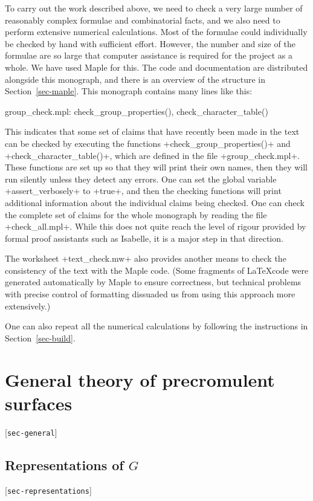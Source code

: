 \documentclass[reqno]{amsart}
\newcommand{\lbl}[1]{\label{#1}\textup{[\texttt{#1}]}\par}
\newcommand{\lbl}{\label}
\renewcommand{\:}{\colon}
\theoremstyle{definition}
\begin{document}
To carry out the work described above, we need to check a very large
number of reasonably complex formulae and combinatorial facts, and we
also need to perform extensive numerical calculations.  Most of the
formulae could individually be checked by hand with sufficient effort.
However, the number and size of the formulae are so large that
computer assistance is required for the project as a whole.  We have
used Maple for this.  The code and documentation are distributed
alongside this monograph, and there is an overview of the structure in
Section~\ref{sec-maple}.  This monograph contains many lines like
this:
\begin{checks}
 group_check.mpl: check_group_properties(), check_character_table()
\end{checks}
This indicates that some set of claims that have recently been made in
the text can be checked by executing the functions
\mcode+check_group_properties()+ and \mcode+check_character_table()+,
which are defined in the file \fname+group_check.mpl+.  These functions
are set up so that they will print their own names, then they will run
silently unless they detect any errors.  One can set the global
variable \mcode+assert_verbosely+ to \mcode+true+, and then the checking
functions will print additional information about the individual
claims being checked.  One can check the complete set of claims for
the whole monograph by reading the file \fname+check_all.mpl+.  While
this does not quite reach the level of rigour provided by formal proof
assistants such as Isabelle, it is a major step in that direction.

The worksheet \fname+text_check.mw+ also provides another means to check
the consistency of the text with the Maple code.  (Some fragments of
\LaTeX code were generated automatically by Maple to ensure
correctness, but technical problems with precise control of formatting
dissuaded us from using this approach more extensively.)

One can also repeat all the numerical calculations by following the
instructions in Section~\ref{sec-build}.

\section{General theory of precromulent surfaces}
\lbl{sec-general}

\subsection{Representations of \texorpdfstring{$G$}{G}}
\lbl{sec-representations}
\end{document}
